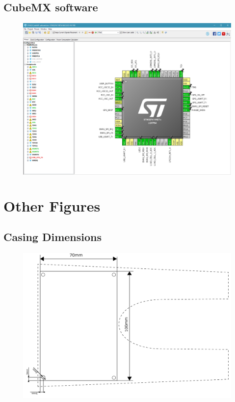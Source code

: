 \subsection{CubeMX software}\label{sec:app:mxc}
\begin{figure}[tbh]
	\centering
    	\includegraphics[width=\linewidth]{Figures/MXCube.png}
	\label{fig:mxc}
\end{figure}

\clearpage
\section{Other Figures}
\subsection{Casing Dimensions}
\begin{figure}[htb]
	\centering
    \includegraphics[width=\linewidth]{Figures/casing_dimensions.png}
	\label{fig:casdim}
\end{figure}

